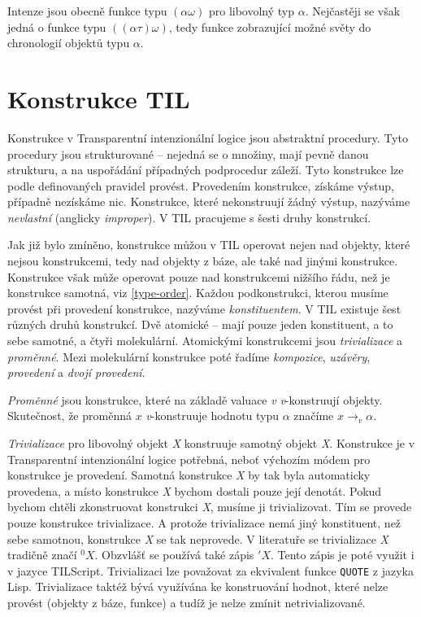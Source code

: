 Intenze jsou obecně funkce typu $(\alpha\omega)$ pro libovolný typ $\alpha$. Nejčastěji se však
jedná o funkce typu $((\alpha\tau)\omega)$, tedy funkce zobrazující možné světy do chronologií
objektů typu $\alpha$.

\section{Konstrukce TIL}

Konstrukce v Transparentní intenzionální logice jsou abstraktní procedury. Tyto procedury jsou
strukturované -- nejedná se o množiny, mají pevně danou strukturu, a na uspořádání případných
podprocedur záleží. Tyto konstrukce lze podle definovaných pravidel provést. Provedením konstrukce,
získáme výstup, případně nezískáme nic. Konstrukce, které nekonstruují žádný výstup, nazýváme
\textit{nevlastní} (anglicky \textit{improper}). V TIL pracujeme s šesti druhy konstrukcí.

Jak již bylo zmíněno, konstrukce můžou v TIL operovat nejen nad objekty, které nejsou konstrukcemi,
tedy nad objekty z báze, ale také nad jinými konstrukce. Konstrukce však může operovat pouze nad
konstrukcemi nižšího řádu, než je konstrukce samotná, viz \ref{type-order}. Každou podkonstrukci,
kterou musíme provést při provedení konstrukce, nazýváme \textit{konstituentem}. V TIL existuje
šest různých druhů konstrukcí. Dvě atomické -- mají pouze jeden konstituent, a to sebe samotné,
a čtyři molekulární. Atomickými konstrukcemi jsou \textit{trivializace} a \textit{proměnné}. Mezi
molekulární konstrukce poté řadíme \textit{kompozice}, \textit{uzávěry}, \textit{provedení} a
\textit{dvojí provedení}.

\textit{Proměnné} jsou konstrukce, které na základě valuace \textit{v} \textit{v}-konstruují
objekty. Skutečnost, že proměnná $x$ \textit{v}-konstruuje hodnotu typu $\alpha$ značíme
$x \rightarrow_v \alpha$.

\lstset{language=Lisp}
\textit{Trivializace} pro libovolný objekt \textit{X} konstruuje samotný objekt \textit{X}.
Konstrukce je v Transparentní intenzionální logice potřebná, neboť výchozím módem pro konstrukce
je provedení. Samotná konstrukce \textit{X} by tak byla automaticky provedena, a místo konstrukce
\textit{X} bychom dostali pouze její denotát. Pokud bychom chtěli zkonstruovat konstrukci
\textit{X}, musíme ji trivializovat. Tím se provede pouze konstrukce trivializace. A protože
trivializace nemá jiný konstituent, než sebe samotnou, konstrukce \textit{X} se tak neprovede.
V literatuře se trivializace \textit{X} tradičně značí ${}^0X$. Obzvlášť se používá také zápis
$'X$. Tento zápis je poté využit i v jazyce TILScript. Trivializaci lze považovat za ekvivalent
funkce \lstinline{QUOTE} z jazyka Lisp. Trivializace taktéž bývá využívána ke konstruování hodnot,
které nelze provést (objekty z báze, funkce) a tudíž je nelze zmínit netrivializované.

